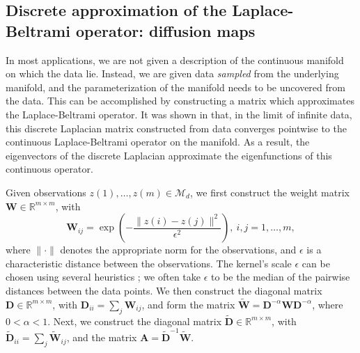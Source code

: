 \documentclass[3p]{elsarticle}
\begin{document}
\subsection{Discrete approximation of the Laplace-Beltrami operator: diffusion maps}

In most applications, we are not given a description of the continuous manifold on which the data lie.
%
Instead, we are given data {\em sampled} from the underlying manifold,
and the parameterization of the manifold needs to be uncovered from the data.
%
This can be accomplished by constructing a matrix which approximates the Laplace-Beltrami operator.
%
It was shown in \cite{coifman2006geometric} that, in the limit of infinite data,
this discrete Laplacian matrix constructed from data converges pointwise to the continuous Laplace-Beltrami operator on the manifold.
%
As a result, the eigenvectors of the discrete Laplacian approximate the eigenfunctions of this continuous operator.

Given observations $z(1), \dots, z(m) \in \mathcal{M}_d$, we first construct the weight matrix $\mathbf{W} \in \mathbb{R}^{m \times m}$, with
\begin{equation} \label{eq:W}
\mathbf{W}_{ij} = \exp \left( -\frac{\|z(i) - z(j) \|^2}{\epsilon^2} \right), \ i,j=1,\ldots,m,
\end{equation}
where $\| \cdot \|$ denotes the appropriate norm for the observations, and $\epsilon$ is a characteristic distance between the observations.
%
The kernel's scale $\epsilon$ can be chosen using several heuristics \cite{rohrdanz2011determination, coifman2008graph};
we often take $\epsilon$ to be the median of the pairwise distances between the data points.
%
We then construct the diagonal matrix $\mathbf{D} \in \mathbb{R}^{m \times m}$, with $\mathbf{D}_{ii} = \sum_j \mathbf{W}_{ij}$,
and form the matrix $\widetilde{\mathbf{W}} = \mathbf{D}^{-\alpha} \mathbf{W} \mathbf{D}^{-\alpha}$, where $0 < \alpha < 1$.
%
Next, we construct the diagonal matrix $\widetilde{\mathbf{D}} \in \mathbb{R}^{m \times m}$, with $\widetilde{\mathbf{D}}_{ii} = \sum_j \widetilde{\mathbf{W}}_{ij}$, and the matrix $\mathbf{A}  = \widetilde{\mathbf{D}}^{-1} \widetilde{\mathbf{W}}.$
\end{document}
